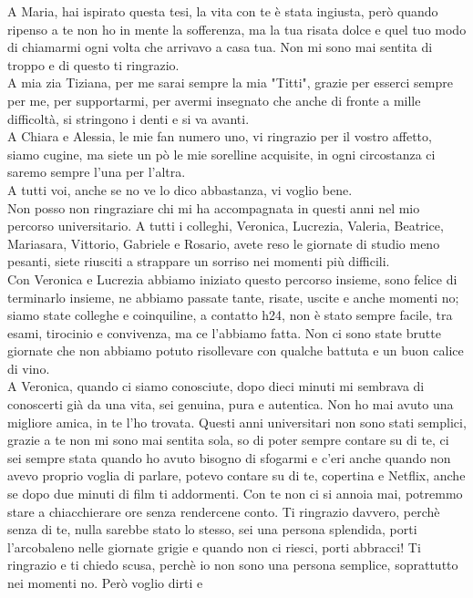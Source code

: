 A Maria, hai ispirato questa tesi, la vita con te è stata ingiusta, però quando ripenso a te non ho in mente
la sofferenza, ma la tua risata dolce e quel tuo modo di chiamarmi ogni volta che arrivavo a casa tua. Non mi sono mai 
sentita di troppo e di questo ti ringrazio.\\
A mia zia Tiziana, per me sarai sempre la mia "Titti", grazie per esserci sempre per me, per supportarmi, per avermi
insegnato che anche di fronte a mille difficoltà, si stringono i denti e si va avanti.\\
A Chiara e Alessia, le mie fan numero uno, vi ringrazio per il vostro affetto, siamo cugine, ma siete un pò le mie 
sorelline acquisite, in ogni circostanza ci saremo sempre l’una per l’altra.\\
A tutti voi, anche se no ve lo dico abbastanza, vi voglio bene.\\
Non posso non ringraziare chi mi ha accompagnata in questi anni nel mio percorso universitario. A tutti i colleghi, 
Veronica, Lucrezia, Valeria, Beatrice, Mariasara, Vittorio, Gabriele e Rosario, avete reso le giornate di studio meno 
pesanti, siete riusciti a strappare un sorriso nei momenti più difficili.\\
Con Veronica e Lucrezia abbiamo iniziato questo percorso insieme, sono felice di terminarlo insieme, ne abbiamo passate 
tante, risate, uscite e anche momenti no; siamo state colleghe e coinquiline, a contatto h24, non è stato sempre facile, 
tra esami, tirocinio e convivenza, ma ce l’abbiamo fatta. Non ci sono state brutte giornate che non abbiamo 
potuto risollevare con qualche battuta e un buon calice di vino.\\
A Veronica, quando ci siamo conosciute, dopo dieci minuti mi sembrava di conoscerti già da 
una vita, sei genuina, pura e autentica. Non ho mai avuto una migliore amica, in te l’ho trovata. Questi anni universitari 
non sono stati semplici, grazie a te non mi sono mai sentita sola, so di poter sempre contare su di te, ci sei sempre 
stata quando ho avuto bisogno di sfogarmi e c’eri anche quando non avevo proprio voglia di parlare, potevo contare su 
di te, copertina e Netflix, anche se dopo due minuti di film ti addormenti. Con te non ci si annoia mai, potremmo stare 
a chiacchierare ore senza rendercene conto. Ti ringrazio davvero, perchè senza di te, nulla sarebbe stato lo stesso, 
sei una persona splendida, porti l’arcobaleno nelle giornate grigie e quando non ci riesci, porti abbracci! 
Ti ringrazio e ti chiedo scusa, perchè io non sono una persona semplice, soprattutto nei momenti no. Però voglio dirti e 
